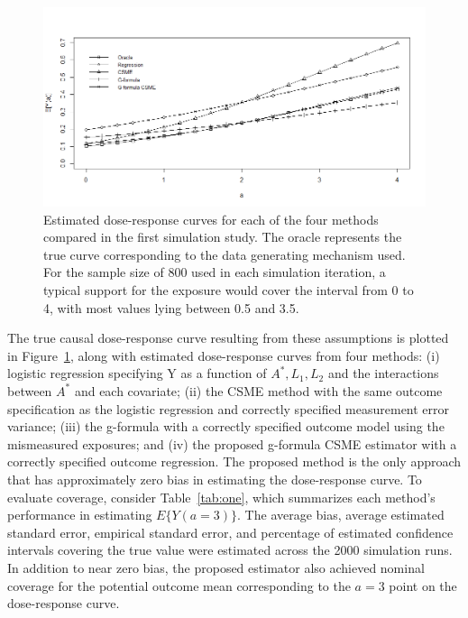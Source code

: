 \documentclass[useAMS,usenatbib,referee]{biom}
\begin{document}
\begin{figure}
\centering
\includegraphics[width=6in]{fig2.png}
\caption{Estimated dose-response curves for each of the four methods compared in the first simulation study. The oracle represents the true curve corresponding to the data generating mechanism used. For the sample size of 800 used in each simulation iteration, a typical support for the exposure would cover the interval from 0 to 4, with most values lying between 0.5 and 3.5.}
\label{fig:two}
\end{figure}

The true causal dose-response curve resulting from these assumptions is plotted in Figure~\ref{fig:two}, along with estimated dose-response curves from four methods: (i) logistic regression specifying Y as a function of $A^{*}, L_{1}, L_{2}$ and the interactions between $A^{*}$ and each covariate; (ii) the CSME method with the same outcome specification as the logistic regression and correctly specified measurement error variance; (iii) the g-formula with a correctly specified outcome model using the mismeasured exposures; and (iv) the proposed g-formula CSME estimator with a correctly specified outcome regression. The proposed method is the only approach that has approximately zero bias in estimating the dose-response curve. To evaluate coverage, consider Table~\ref{tab:one}, which summarizes each method's performance in estimating $E\{ Y(a = 3) \}$. The average bias, average estimated standard error, empirical standard error, and percentage of estimated confidence intervals covering the true value were estimated across the 2000 simulation runs. In addition to near zero bias, the proposed estimator also achieved nominal coverage for the potential outcome mean corresponding to the $a = 3$ point on the dose-response curve.
\end{document}
